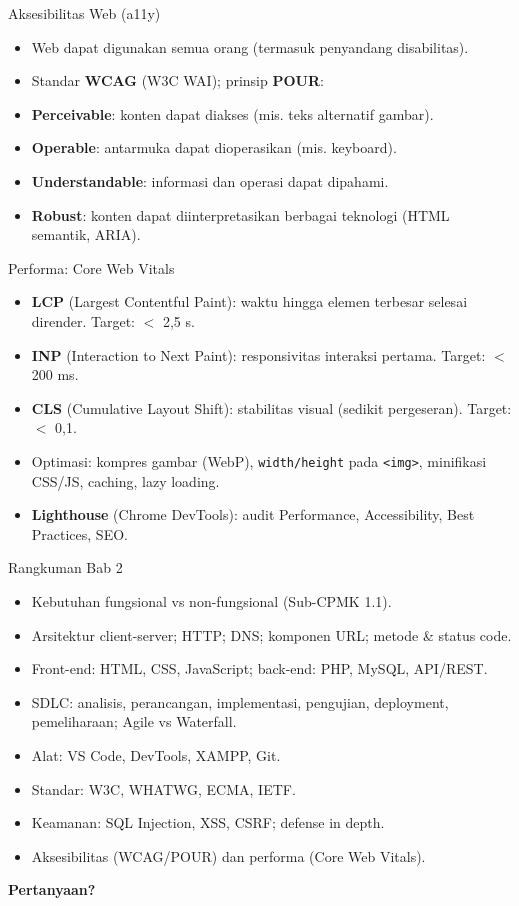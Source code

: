 \documentclass[handout]{beamer}
\begin{document}
\begin{frame}{Aksesibilitas Web (a11y)}
	\begin{itemize}
		\item Web dapat digunakan semua orang (termasuk penyandang disabilitas).
		\item Standar \textbf{WCAG} (W3C WAI); prinsip \textbf{POUR}:
		\item \textbf{Perceivable}: konten dapat diakses (mis. teks alternatif gambar).
		\item \textbf{Operable}: antarmuka dapat dioperasikan (mis. keyboard).
		\item \textbf{Understandable}: informasi dan operasi dapat dipahami.
		\item \textbf{Robust}: konten dapat diinterpretasikan berbagai teknologi (HTML semantik, ARIA).
	\end{itemize}
\end{frame}

\begin{frame}{Performa: Core Web Vitals}
	\begin{itemize}
		\item \textbf{LCP} (Largest Contentful Paint): waktu hingga elemen terbesar selesai dirender. Target: $<$ 2,5 s.
		\item \textbf{INP} (Interaction to Next Paint): responsivitas interaksi pertama. Target: $<$ 200 ms.
		\item \textbf{CLS} (Cumulative Layout Shift): stabilitas visual (sedikit pergeseran). Target: $<$ 0,1.
		\item Optimasi: kompres gambar (WebP), \texttt{width/height} pada \texttt{<img>}, minifikasi CSS/JS, caching, lazy loading.
		\item \textbf{Lighthouse} (Chrome DevTools): audit Performance, Accessibility, Best Practices, SEO.
	\end{itemize}
\end{frame}

\begin{frame}{Rangkuman Bab 2}
	\begin{itemize}
		\item Kebutuhan fungsional vs non-fungsional (Sub-CPMK 1.1).
		\item Arsitektur client-server; HTTP; DNS; komponen URL; metode \& status code.
		\item Front-end: HTML, CSS, JavaScript; back-end: PHP, MySQL, API/REST.
		\item SDLC: analisis, perancangan, implementasi, pengujian, deployment, pemeliharaan; Agile vs Waterfall.
		\item Alat: VS Code, DevTools, XAMPP, Git.
		\item Standar: W3C, WHATWG, ECMA, IETF.
		\item Keamanan: SQL Injection, XSS, CSRF; defense in depth.
		\item Aksesibilitas (WCAG/POUR) dan performa (Core Web Vitals).
	\end{itemize}
\end{frame}

\begin{frame}{}
	\centering
	\vfill
	\textbf{\Large Pertanyaan?}
	\vfill
\end{frame}
\end{document}
